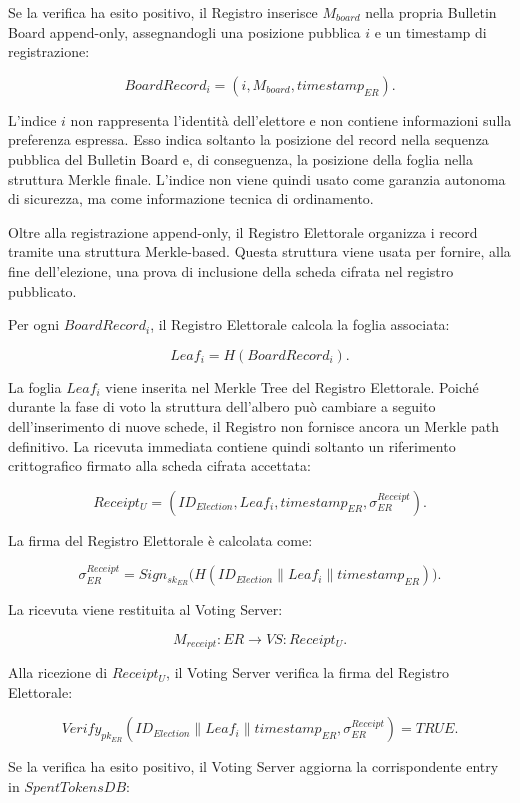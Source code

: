 \documentclass[a4paper,12pt]{article}
\begin{document}
Se la verifica ha esito positivo, il Registro inserisce \(M_{board}\) nella propria Bulletin Board append-only, assegnandogli una posizione pubblica \(i\) e un timestamp di registrazione:

\[
	BoardRecord_i =
	(i, M_{board}, timestamp_{ER}).
\]

L'indice \(i\) non rappresenta l'identit\`a dell'elettore e non contiene informazioni sulla preferenza espressa.
Esso indica soltanto la posizione del record nella sequenza pubblica del Bulletin Board e, di conseguenza, la posizione della foglia nella struttura Merkle finale.
L'indice non viene quindi usato come garanzia autonoma di sicurezza, ma come informazione tecnica di ordinamento.

Oltre alla registrazione append-only, il Registro Elettorale organizza i record tramite una struttura Merkle-based.
Questa struttura viene usata per fornire, alla fine dell'elezione, una prova di inclusione della scheda cifrata nel registro pubblicato.

Per ogni \(BoardRecord_i\), il Registro Elettorale calcola la foglia associata:

\[
	Leaf_i =
	H(BoardRecord_i).
\]

La foglia \(Leaf_i\) viene inserita nel Merkle Tree del Registro Elettorale.
Poich\'e durante la fase di voto la struttura dell'albero pu\`o cambiare a seguito dell'inserimento di nuove schede, il Registro non fornisce ancora un Merkle path definitivo.
La ricevuta immediata contiene quindi soltanto un riferimento crittografico firmato alla scheda cifrata accettata:

\[
	Receipt_U =
	(ID_{Election}, Leaf_i, timestamp_{ER}, \sigma_{ER}^{Receipt}).
\]

La firma del Registro Elettorale \`e calcolata come:

\[
	\sigma_{ER}^{Receipt} =
	Sign_{sk_{ER}}
	\big(
	H(ID_{Election} \parallel Leaf_i \parallel timestamp_{ER})
	\big).
\]

La ricevuta viene restituita al Voting Server:

\[
	M_{receipt} : ER \rightarrow VS :
	Receipt_U.
\]

Alla ricezione di \(Receipt_U\), il Voting Server verifica la firma del Registro Elettorale:

\[
	Verify_{pk_{ER}}(ID_{Election} \parallel Leaf_i \parallel timestamp_{ER}, \sigma_{ER}^{Receipt}) = TRUE.
\]

Se la verifica ha esito positivo, il Voting Server aggiorna la corrispondente entry in \(SpentTokensDB\):
\end{document}
